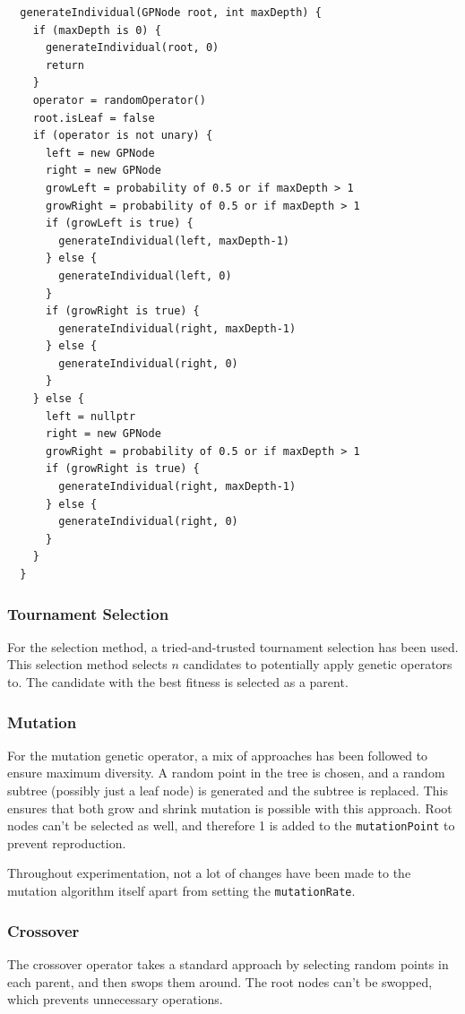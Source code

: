 \documentclass{article}
\begin{document}
\begin{verbatim}
  generateIndividual(GPNode root, int maxDepth) {
    if (maxDepth is 0) {
      generateIndividual(root, 0)
      return
    }
    operator = randomOperator()
    root.isLeaf = false
    if (operator is not unary) {
      left = new GPNode
      right = new GPNode
      growLeft = probability of 0.5 or if maxDepth > 1
      growRight = probability of 0.5 or if maxDepth > 1
      if (growLeft is true) {
        generateIndividual(left, maxDepth-1)
      } else {
        generateIndividual(left, 0)
      }
      if (growRight is true) {
        generateIndividual(right, maxDepth-1)
      } else {
        generateIndividual(right, 0)
      }
    } else {
      left = nullptr
      right = new GPNode
      growRight = probability of 0.5 or if maxDepth > 1
      if (growRight is true) {
        generateIndividual(right, maxDepth-1)
      } else {
        generateIndividual(right, 0)
      }
    }
  }
  \end{verbatim}

\subsubsection{Tournament Selection}
For the selection method, a tried-and-trusted tournament selection has been used. This selection method selects \(n\) candidates to potentially apply genetic operators to. The candidate with the best fitness is selected as a parent.

\subsubsection{Mutation}
For the mutation genetic operator, a mix of approaches has been followed to ensure maximum diversity. A random point in the tree is chosen, and a random subtree (possibly just a leaf node) is generated and the subtree is replaced. This ensures that both grow and shrink mutation is possible with this approach. Root nodes can't be selected as well, and therefore 1 is added to the \texttt{mutationPoint} to prevent reproduction.

Throughout experimentation, not a lot of changes have been made to the mutation algorithm itself apart from setting the \texttt{mutationRate}.

\subsubsection{Crossover}
The crossover operator takes a standard approach by selecting random points in each parent, and then swops them around. The root nodes can't be swopped, which prevents unnecessary operations.
\end{document}
